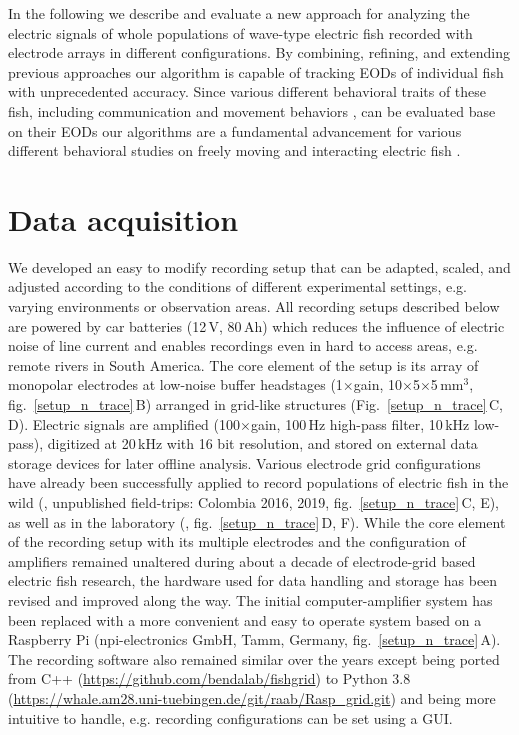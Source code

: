 \documentclass[11pt,pdftex]{article}
\newcommand{\panel}[1]{\textsf{#1}}
\newcommand{\subfref}[2]{\textup{\ref{#1}}\,\panel{#2}}
\newcommand{\fig}{Fig.}
\newcommand{\subfigref}[2]{\fig~\subfref{#1}{#2}}
\newcommand{\figb}{fig.}
\newcommand{\subfigrefb}[2]{\figb~\subfref{#1}{#2}}
\begin{document}
In the following we describe and evaluate a new approach for analyzing the electric signals of whole populations of wave-type electric fish recorded with electrode arrays in different configurations. By combining, refining, and extending previous approaches our algorithm is capable of tracking EODs of individual fish with unprecedented accuracy. Since various different behavioral traits of these fish, including communication \citep{Smith2013} and movement behaviors \citep{Madhav2018}, can be evaluated base on their EODs our algorithms are a fundamental advancement for various different behavioral studies on freely moving and interacting electric fish \citep{Raab2019, Raab2021}.

\section{Data acquisition}

We developed an easy to modify recording setup that can be adapted, scaled, and adjusted according to the conditions of different experimental settings, e.g. varying environments or observation areas. All recording setups described below are powered by car batteries (12\,V, 80\,Ah) which reduces the influence of electric noise of line current and enables recordings even in hard to access areas, e.g. remote rivers in South America. The core element of the setup is its array of monopolar electrodes at low-noise buffer headstages (1$\times$gain, 10$\times$5$\times$5\,mm$^3$, \subfigrefb{setup_n_trace}{B}) arranged in grid-like structures (\subfigref{setup_n_trace}{C, D}). Electric signals are amplified (100$\times$gain, 100\,Hz high-pass filter, 10\,kHz low-pass), digitized at 20\,kHz with 16 bit resolution, and stored on external data storage devices for later offline analysis. Various electrode grid configurations have already been successfully applied to record populations of electric fish in the wild (\citealp{Henninger2018, Henninger2020}, unpublished field-trips: Colombia 2016, 2019, \subfigrefb{setup_n_trace}{C, E}), as well as in the laboratory (\citealp{Raab2019, Raab2021}, \subfigrefb{setup_n_trace}{D, F}). While the core element of the recording setup with its multiple electrodes and the configuration of amplifiers remained unaltered during about a decade of electrode-grid based electric fish research, the hardware used for data handling and storage has been revised and improved along the way. The initial computer-amplifier system has been replaced with a more convenient and easy to operate system based on a Raspberry Pi (npi-electronics GmbH, Tamm, Germany, \subfigrefb{setup_n_trace}{A}). The recording software also remained similar over the years except being ported from C++ (\url{https://github.com/bendalab/fishgrid}) to Python 3.8 (\url{https://whale.am28.uni-tuebingen.de/git/raab/Rasp_grid.git}) and being more intuitive to handle, e.g. recording configurations can be set using a GUI.
\end{document}
